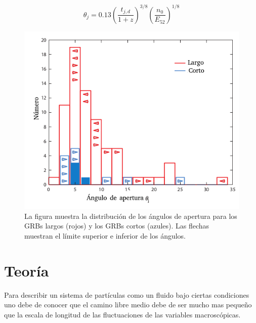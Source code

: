 \documentclass[12pt,a4paper]{book}
\begin{document}
%
%
%
\begin{equation}
\theta_j = 0.13 \left( \frac{t_{j,d}}{1+z} \right)^{3/8}
\left(\frac{n_0}{E_{52}} \right)^{1/8}
\end{equation}
%
%

\begin{figure}
\centering
\includegraphics[scale=0.7]{./Figuras/Distribucion_angulo_apertura}
\caption{La figura muestra la distribución de los ángulos de apertura para los GRBs largos (rojos) y los GRBs cortos (azules). Las flechas muestran el límite superior e inferior de los ángulos. }
\end{figure}
\chapter{Teoría}
Para describir un sistema de partículas como un fluido bajo ciertas condiciones uno debe de conocer que el camino libre medio debe de ser mucho mas pequeño que la escala de longitud de las fluctuaciones de las variables macroscópicas.
\end{document}
